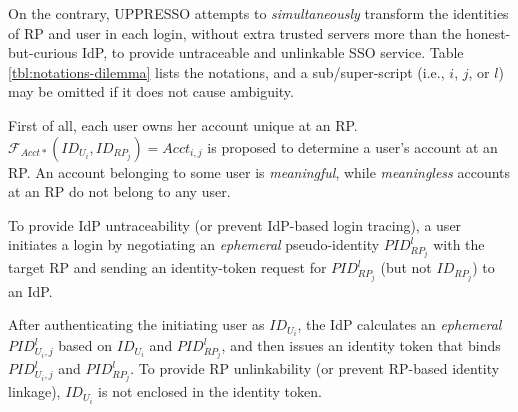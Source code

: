 On the contrary,
     UPPRESSO attempts to \emph{simultaneously} transform the identities of RP and user in each login,
        without extra trusted servers more than the honest-but-curious IdP,
         to provide untraceable and unlinkable SSO service.
%
Table \ref{tbl:notations-dilemma} lists the notations,
and a sub/super-script (i.e., $i$, $j$, or $l$) may be omitted if it does not cause ambiguity.




First of all, each user owns her account unique at an RP.
$\mathcal{F}_{Acct\ast}(ID_{U_i}, ID_{RP_j}) = Acct_{i,j}$ is proposed to determine a user's account at an RP.
An account belonging to some user is \emph{meaningful},
while \emph{meaningless} accounts at an RP do not belong to any user.

To provide IdP untraceability (or prevent IdP-based login tracing),
    a user initiates a login by negotiating an \emph{ephemeral} pseudo-identity $PID^l_{RP_j}$  with the target RP and sending an identity-token request for $PID^l_{RP_j}$ (but not $ID_{RP_j}$) to an IdP.

After authenticating the initiating user as $ID_{U_i}$, the IdP calculates an \emph{ephemeral} $PID^l_{U_i,j}$ based on $ID_{U_i}$ and $PID^l_{RP_j}$, and then issues an identity token that binds $PID^l_{U_i,j}$ and $PID^l_{RP_j}$.
To provide RP unlinkability (or prevent RP-based identity linkage),
    $ID_{U_i}$ is not enclosed in the identity token.

